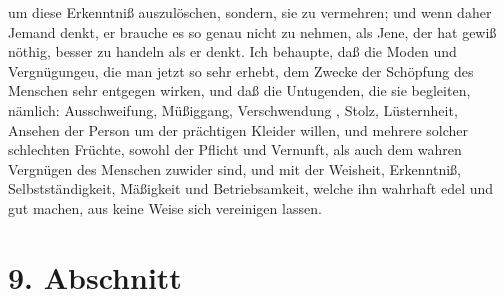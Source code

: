 um diese Erkenntniß auszulöschen, sondern, sie zu vermehren; und wenn daher
Jemand denkt, er brauche es so genau nicht zu nehmen, als Jene, der hat gewiß
nöthig, besser zu handeln als er denkt. Ich behaupte, daß die Moden und
Vergnügungeu, die man jetzt so sehr erhebt, dem Zwecke der Schöpfung des
Menschen sehr entgegen wirken, und daß die Untugenden, die sie begleiten,
nämlich: Ausschweifung, Müßiggang, Verschwendung , Stolz, Lüsternheit, Ansehen
der Person um der prächtigen Kleider willen, und mehrere solcher schlechten
Früchte, sowohl der Pflicht und Vernunft, als auch dem wahren Vergnügen des
Menschen zuwider sind, und mit der Weisheit, Erkenntniß, Selbstständigkeit,
Mäßigkeit und Betriebsamkeit, welche ihn wahrhaft edel und gut machen, aus keine
Weise sich vereinigen lassen.

\section{9. Abschnitt} \label{kap14_ab9}


